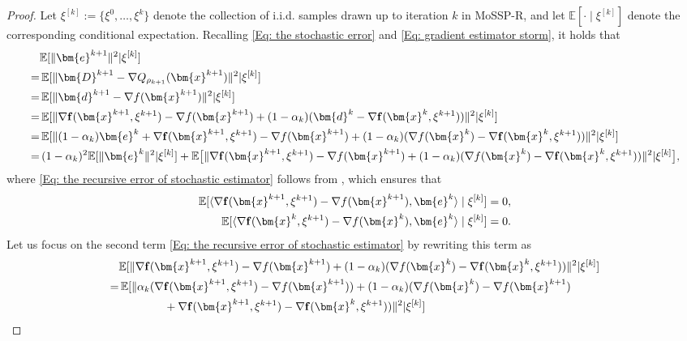 \documentclass{article}
\theoremstyle{plain}
\theoremstyle{definition}
\theoremstyle{remark}
\newcommand{\EE}{\mathbb{E}}
\newcommand{\bx}{\bm{x}}
\newcommand{\be}{\bm{e}}
\newcommand{\bd}{\bm{d}}
\newcommand{\bD}{\bm{D}}
\newcommand{\tf}{\mathbf{f}}
\numberwithin{equation}{section}
\begin{document}
\begin{proof}
Let $\xi^{[k]} := \{\xi^0,\ldots,\xi^k\}$ denote the collection of i.i.d. samples drawn up to iteration $k$ in MoSSP-R, and let $\EE[\cdot \mid \xi^{[k]}]$ denote the corresponding conditional expectation. Recalling \eqref{Eq: the stochastic error} and \eqref{Eq: gradient estimator storm}, it holds that
\begin{align}
    &\EE[\|\be^{k+1}\|^2|\xi^{[k]}] \notag \\
    =&\, \EE[\|\bD^{k+1}- \nabla Q_{\rho_{k+1}}(\bx^{k+1})\|^2|\xi^{[k]}] \notag\\
    =&\, \EE[\|\bd^{k+1} - \nabla f(\bx^{k+1})\|^2|\xi^{[k]}] \notag \\
    =&\, \EE[\| \nabla \tf(\bx^{k+1}, \xi^{k+1}) - \nabla f(\bx^{k+1}) + (1 - \alpha_{k})(\bd^{k}- \nabla \tf(\bx^{k}, \xi^{k+1})) \|^2 |\xi^{[k]}] \notag \\
    =&\, \EE[\| (1- \alpha_{k})\be^{k}+ \nabla \tf(\bx^{k+1}, \xi^{k+1}) - \nabla f(\bx^{k+1}) + (1 - \alpha_{k})(\nabla f(\bx^{k}) - \nabla \tf(\bx^{k}, \xi^{k+1})) \|^2 |\xi^{[k]}] \notag \\
     =&\,(1 - \alpha_{k})^{2}\EE[\|\be^{k}\|^{2}|\xi^{[k]}] + \EE\bigl[\| \nabla \tf(\bx^{k+1}, \xi^{k+1}) - \nabla f(\bx^{k+1}) + (1 - \alpha_{k})(\nabla f(\bx^{k}) - \nabla \tf(\bx^{k}, \xi^{k+1}))\|^{2} |\xi^{[k]}\bigr],
    \label{Eq: the recursive error of stochastic estimator}
\end{align}
where \eqref{Eq: the recursive error of stochastic estimator} follows from , which ensures that
\begin{align}
    \EE[\langle \nabla \tf(\bx^{k+1}, \xi^{k+1}) - \nabla f(\bx^{k+1}), \be^{k}\rangle \mid \xi^{[k]}] &= 0, \notag \\
    \EE[\langle \nabla \tf(\bx^{k}, \xi^{k+1}) - \nabla f(\bx^{k}), \be^{k}\rangle \mid \xi^{[k]}] &= 0. \notag
\end{align}
    Let us focus on the second term \eqref{Eq: the recursive error of stochastic estimator} by rewriting this term as
   \begin{align}
     &\EE[\| \nabla \tf(\bx^{k+1}, \xi^{k+1}) - \nabla f(\bx^{k+1}) + (1 - \alpha_{k})(\nabla f(\bx^{k}) - \nabla \tf(\bx^{k}, \xi^{k+1}))\|^{2}|\xi^{[k]}] \notag \\
=&\, \EE[\| \alpha_{k}(\nabla \tf(\bx^{k+1}, \xi^{k+1}) - \nabla f(\bx^{k+1})) + (1 - \alpha_{k})(\nabla f(\bx^{k}) - \nabla f(\bx^{k+1}) \notag \\
     &\qquad\qquad + \nabla \tf(\bx^{k+1}, \xi^{k+1}) - \nabla \tf(\bx^{k}, \xi^{k+1}))\|^{2}|\xi^{[k]}] \notag \\

\end{align}
\end{proof}
\end{document}
